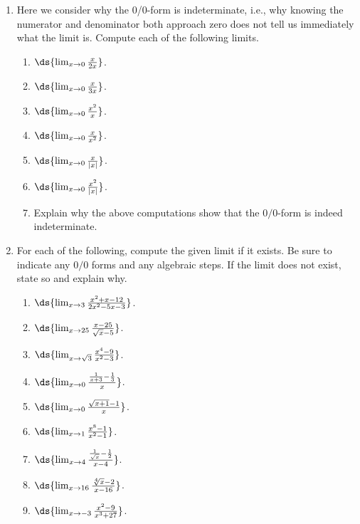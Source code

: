 \begin{multicols}{2}
\begin{enumerate}
\item Here we consider why the 0/0-form is indeterminate, 
      i.e., why knowing the numerator and denominator both
      approach zero does not tell us immediately what the 
      limit is.  Compute each of the following limits.
  \begin{enumerate}
  \item $\ds{\lim_{x\to0}\frac{x}{2x}}$.
  \item $\ds{\lim_{x\to0}\frac{x}{3x}}$.
  \item $\ds{\lim_{x\to0}\frac{x^2}{x}}$.
  \item $\ds{\lim_{x\to0}\frac{x}{x^2}}$.
  \item $\ds{\lim_{x\to0}\frac{x}{|x|}}$.
  \item $\ds{\lim_{x\to0}\frac{x^2}{|x|}}$.
  \item Explain why the above computations show that the $0/0$-form 
        is indeed indeterminate.
  \end{enumerate}


\item For each of the following, compute the given
limit if it exists. Be sure to indicate any $0/0$ forms
and any algebraic steps.  If the limit does not
exist, state so and explain why.
 \begin{enumerate}
 \item $\ds{\lim_{x\to3}\frac{x^2+x-12}{2x^2-5x-3}}$.
 \item $\ds{\lim_{x\to25}\frac{x-25}{\sqrt{x}-5}}$.
 \item $\ds{\lim_{x\to\sqrt3}\frac{x^4-9}{x^2-3}}$.
 \item $\ds{\lim_{x\to0}{\frac{\frac{1}{x+3}-\frac13}x}}$.
 \item $\ds{\lim_{x\to0}{\frac{\sqrt{x+1}-1}{x}}}$.
 \item $\ds{\lim_{x\to1}\frac{x^8-1}{x^2-1}}$.
 \item $\ds{\lim_{x\to4}\frac{\frac1{\sqrt x}-\frac12}{x-4}}$.
 \item $\ds{\lim_{x\to16}\frac{\sqrt[4]x-2}{x-16}}$.
 \item $\ds{\lim_{x\to-3}\frac{x^2-9}{x^3+27}}$.

 \end{enumerate}



\end{enumerate}
\end{multicols}
